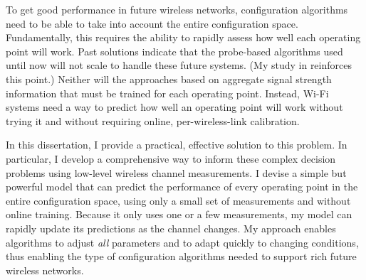 To get good performance in future wireless networks, configuration algorithms need to be able to take into account the entire configuration space. Fundamentally, this requires the ability to rapidly assess how well each operating point will work. Past solutions indicate that the probe-based algorithms used until now will not scale to handle these future systems. (My study in  reinforces this point.) Neither will the approaches based on aggregate signal strength information that must be trained for each operating point. Instead, Wi-Fi systems need a way to predict how well an operating point will work without trying it and without requiring online, per-wireless-link calibration.


In this dissertation, I provide a practical, effective solution to this problem. In particular, I develop a comprehensive way to inform these complex decision problems using low-level wireless channel measurements. I devise a simple but powerful model that can predict the performance of every operating point in the entire configuration space, using only a small set of measurements and without online training. Because it only uses one or a few measurements, my model can rapidly update its predictions as the channel changes. My approach enables algorithms to adjust \emph{all} parameters and to adapt quickly to changing conditions, thus enabling the type of configuration algorithms needed to support rich future wireless networks.

